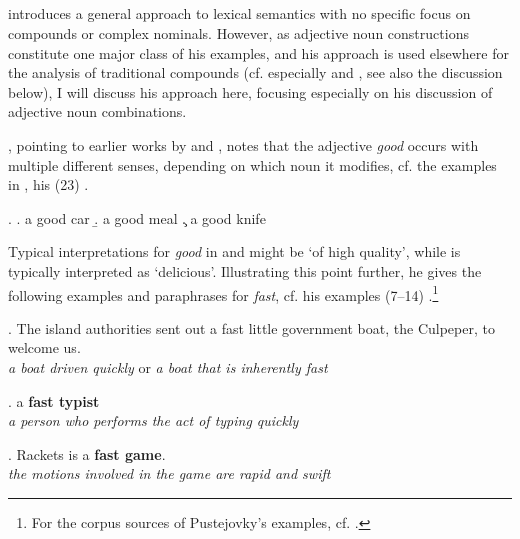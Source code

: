\subsection{\citet{Pustejovsky:1995}}
\label{sec:mixed_approaches:Pustejovsky}



\citet{Pustejovsky:1995} introduces a general approach to lexical semantics
with no specific focus on compounds or complex nominals. However, as adjective noun
constructions constitute one major class of his examples, and his approach is
used elsewhere for the analysis of traditional compounds (cf. especially
\citealt{Jackendoff:2009} and \citealt{Asher:2011}, see also the discussion
below), I will discuss his approach here, focusing especially on his
discussion of adjective noun combinations. 

\citet[32]{Pustejovsky:1995}, pointing to earlier works by \citet{Katz:1964} and \citet{Vendler:1963}, notes that the adjective \emph{good}
occurs with multiple different senses, depending on which noun it modifies, cf. the examples in \Next, his (23) .

\ex. \a. a good car
\b. a good meal
\c. a good knife

Typical interpretations for \emph{good} in \Last[a] and \Last[c] might
be `of high quality', while \Last[b] is typically interpreted as
`delicious'. Illustrating this point further, he gives the following
examples and paraphrases for
\emph{fast}, cf. his examples (7--14)
\citep[44--45]{Pustejovsky:1995}.\footnote{For the corpus sources of
  Pustejovky's examples, cf. \citet[244, Endnote 2]{Pustejovsky:1995}.}

\ex. The island authorities sent out a fast little government boat, the
Culpeper, to welcome us.\\
\emph{a boat driven quickly} or \emph{a boat that is inherently fast}

\ex. a \textbf{fast typist}\\
\emph{a person who performs the act of typing quickly} 

\ex. Rackets is a \textbf{fast game}.\\
\emph{the motions involved in the game are rapid and swift} 

